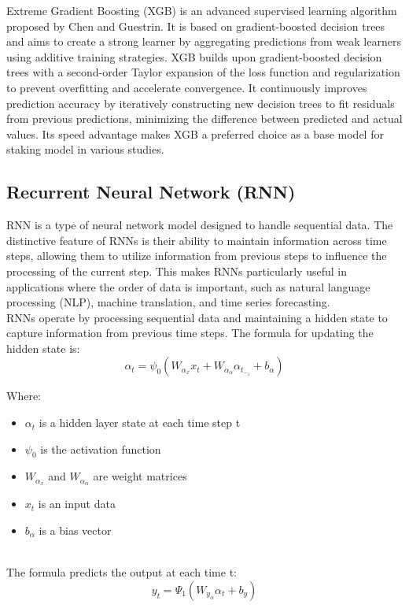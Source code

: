 \documentclass{ieeeojies}
\begin{document}
Extreme Gradient Boosting (XGB) is an advanced supervised learning algorithm proposed by Chen and Guestrin. It is based on gradient-boosted decision trees and aims to create a strong learner by aggregating predictions from weak learners using additive training strategies. XGB builds upon gradient-boosted decision trees with a second-order Taylor expansion of the loss function and regularization to prevent overfitting and accelerate convergence. It continuously improves prediction accuracy by iteratively constructing new decision trees to fit residuals from previous predictions, minimizing the difference between predicted and actual values. Its speed advantage makes XGB a preferred choice as a base model for staking model in various studies.\cite{stacking}

\subsection{Recurrent Neural Network (RNN)}
RNN is a type of neural network model designed to handle sequential data. The distinctive feature of RNNs is their ability to maintain information across time steps, allowing them to utilize information from previous steps to influence the processing of the current step. This makes RNNs particularly useful in applications where the order of data is important, such as natural language processing (NLP), machine translation, and time series forecasting. \cite{zargar2021introduction}\\
RNNs operate by processing sequential data and maintaining a hidden state to capture information from previous time steps. The formula for updating the hidden state is:
\[ \alpha_t=\psi_0(W_\alpha_xx_t + W_\alpha_\alpha\alpha_t_-_1 + b_\alpha) \]

Where:\\
    \begin{itemize}
        \item $\alpha_t$ is a hidden layer state at each time step t
        \item $\psi_0$ is the activation function
        \item $W_\alpha_x$ and $W_\alpha_\alpha$ are weight matrices
        \item $x_t$ is an input data
        \item $b_\alpha$ is a bias vector
    \end{itemize}\\

The formula predicts the output at each time t:\\
\[ y_t = \Psi_1(W_y_\alpha\alpha_t + b_y) \]
\end{document}
